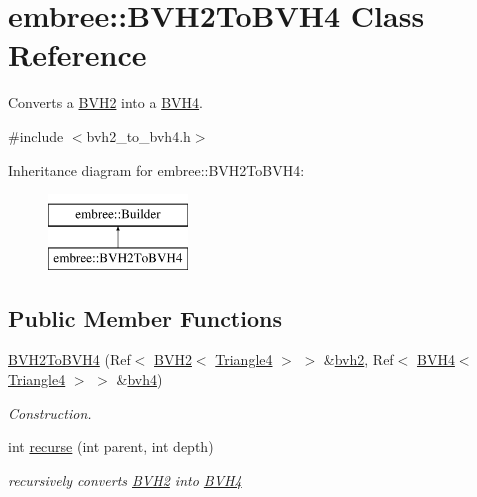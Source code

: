 \hypertarget{classembree_1_1_b_v_h2_to_b_v_h4}{
\section{embree::BVH2ToBVH4 Class Reference}
\label{classembree_1_1_b_v_h2_to_b_v_h4}
}


Converts a \hyperlink{classembree_1_1_b_v_h2}{BVH2} into a \hyperlink{classembree_1_1_b_v_h4}{BVH4}.  




{\ttfamily \#include $<$bvh2\_\-to\_\-bvh4.h$>$}

Inheritance diagram for embree::BVH2ToBVH4:\begin{figure}[H]
\begin{center}
\leavevmode
\includegraphics[height=2.000000cm]{classembree_1_1_b_v_h2_to_b_v_h4}
\end{center}
\end{figure}
\subsection*{Public Member Functions}
\begin{DoxyCompactItemize}
\item 
\hyperlink{classembree_1_1_b_v_h2_to_b_v_h4_a7531657686c33c40a285ac1bbab03699}{BVH2ToBVH4} (Ref$<$ \hyperlink{classembree_1_1_b_v_h2}{BVH2}$<$ \hyperlink{structembree_1_1_triangle4}{Triangle4} $>$ $>$ \&\hyperlink{classembree_1_1_b_v_h2_to_b_v_h4_afa8903905c8d426ac4cf1fdcd4fe65c6}{bvh2}, Ref$<$ \hyperlink{classembree_1_1_b_v_h4}{BVH4}$<$ \hyperlink{structembree_1_1_triangle4}{Triangle4} $>$ $>$ \&\hyperlink{classembree_1_1_b_v_h2_to_b_v_h4_ac0488327c2c25d97d16394f7fe81ba32}{bvh4})
\begin{DoxyCompactList}\small\item\em Construction. \item\end{DoxyCompactList}\item 
int \hyperlink{classembree_1_1_b_v_h2_to_b_v_h4_a99975b6f0d04b744941155984cfea152}{recurse} (int parent, int depth)
\begin{DoxyCompactList}\small\item\em recursively converts \hyperlink{classembree_1_1_b_v_h2}{BVH2} into \hyperlink{classembree_1_1_b_v_h4}{BVH4} \item\end{DoxyCompactList}\end{DoxyCompactItemize}

